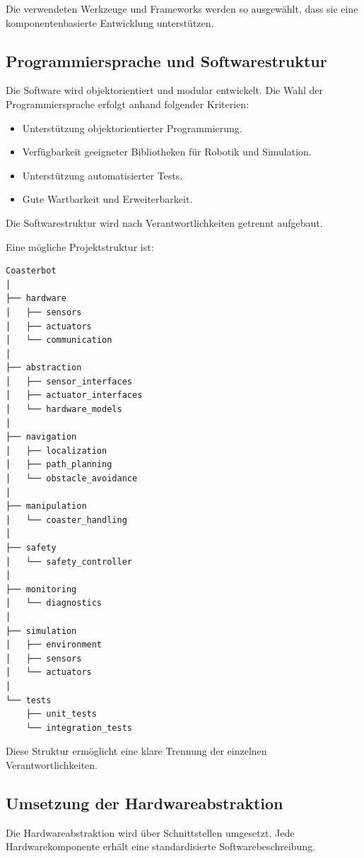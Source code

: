 Die verwendeten Werkzeuge und Frameworks werden so ausgewählt, dass sie
eine komponentenbasierte Entwicklung unterstützen.

\subsection{Programmiersprache und
Softwarestruktur}\label{programmiersprache-und-softwarestruktur}

Die Software wird objektorientiert und modular entwickelt. Die Wahl der
Programmiersprache erfolgt anhand folgender Kriterien:

\begin{itemize}
\tightlist
\item
  Unterstützung objektorientierter Programmierung.
\item
  Verfügbarkeit geeigneter Bibliotheken für Robotik und Simulation.
\item
  Unterstützung automatisierter Tests.
\item
  Gute Wartbarkeit und Erweiterbarkeit.
\end{itemize}

Die Softwarestruktur wird nach Verantwortlichkeiten getrennt aufgebaut.

Eine mögliche Projektstruktur ist:

\begin{verbatim}
Coasterbot
│
├── hardware
│   ├── sensors
│   ├── actuators
│   └── communication
│
├── abstraction
│   ├── sensor_interfaces
│   ├── actuator_interfaces
│   └── hardware_models
│
├── navigation
│   ├── localization
│   ├── path_planning
│   └── obstacle_avoidance
│
├── manipulation
│   └── coaster_handling
│
├── safety
│   └── safety_controller
│
├── monitoring
│   └── diagnostics
│
├── simulation
│   ├── environment
│   ├── sensors
│   └── actuators
│
└── tests
    ├── unit_tests
    └── integration_tests
\end{verbatim}

Diese Struktur ermöglicht eine klare Trennung der einzelnen
Verantwortlichkeiten.

\subsection{Umsetzung der
Hardwareabstraktion}\label{umsetzung-der-hardwareabstraktion}

Die Hardwareabstraktion wird über Schnittstellen umgesetzt. Jede
Hardwarekomponente erhält eine standardisierte Softwarebeschreibung.

